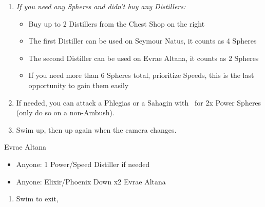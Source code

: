 \begin{enumerate}[resume]
    \item \textit{If you need any Spheres and didn't buy any Distillers:}
    \begin{itemize}
        \item Buy up to 2 Distillers from the Chest Shop on the right
        \item The first Distiller can be used on Seymour Natus, it counts as 4 Spheres
        \item The second Distiller can be used on Evrae Altana, it counts as 2 Spheres
        \item If you need more than 6 Spheres total, prioritize Speeds, this is the last opportunity to gain them easily
    \end{itemize}
    \item If needed, you can attack a Phlegias or a Sahagin with \tidus\ for 2x Power Spheres (only do so on a non-Ambush).
    \item Swim up, then up again when the camera changes.
\end{enumerate}
\begin{battle}{Evrae Altana}
    \begin{itemize}
        \item Anyone: 1 Power/Speed Distiller if needed
        \item Anyone: Elixir/Phoenix Down x2 Evrae Altana
    \end{itemize}
\end{battle}
\begin{enumerate}[resume]
    \item Swim to exit, \sd
\end{enumerate}
\bothcb\bothnpsingle
